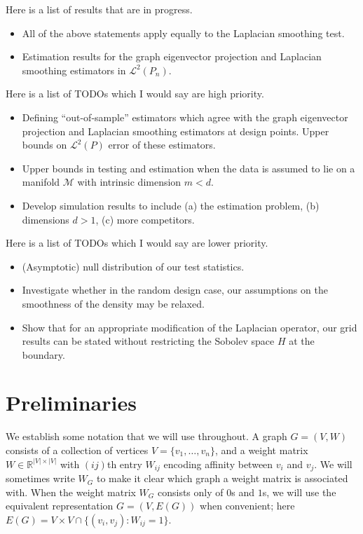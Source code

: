 \documentclass{article}
\newcommand{\Reals}{\mathbb{R}}
\newcommand{\abs}[1]{\left \lvert #1 \right \rvert}
\newcommand{\1}{\mathbf{1}}
\newcommand{\Leb}{\mathcal{L}}
\theoremstyle{alden}
\theoremstyle{aldenthm}
\theoremstyle{definition}
\theoremstyle{remark}
\begin{document}
Here is a list of results that are in progress.
\begin{itemize}
	\item All of the above statements apply equally to the Laplacian smoothing test.
	\item Estimation results for the graph eigenvector projection and Laplacian smoothing estimators in $\Leb^2(P_n)$.
\end{itemize}

Here is a list of TODOs which I would say are high priority.
\begin{itemize}
	\item Defining ``out-of-sample'' estimators which agree with the graph eigenvector projection and Laplacian smoothing estimators at design points. Upper bounds on $\Leb^2(P)$ error of these estimators.
	\item Upper bounds in testing and estimation when the data is assumed to lie on a manifold $\mathcal{M}$ with intrinsic dimension $m < d$.
	\item Develop simulation results to include (a) the estimation problem, (b) dimensions $d > 1$, (c) more competitors.
\end{itemize}
Here is a list of TODOs which I would say are lower priority.
\begin{itemize}
	\item (Asymptotic) null distribution of our test statistics.
	\item Investigate whether in the random design case, our assumptions on the smoothness of the density may be relaxed.
	\item Show that for an appropriate modification of the Laplacian operator, our grid results can be stated without restricting the Sobolev space $H$ at the boundary.
\end{itemize}
	


\section{Preliminaries}

We establish some notation that we will use throughout. A graph $G = (V,W)$ consists of a collection of vertices $V = \{v_1,\ldots,v_n\}$, and a weight matrix $W \in \Reals^{\abs{V} \times \abs{V}}$ with $(ij)$th entry $W_{ij}$ encoding affinity between $v_i$ and $v_j$. We will sometimes write $W_G$ to make it clear which graph a weight matrix is associated with. When the weight matrix $W_G$ consists only of $0$s and $1$s, we will use the equivalent representation $G = (V,E(G))$ when convenient; here $E(G) = V \times V \cap \{(v_i,v_j): W_{ij} = 1\}$. 
\end{document}
